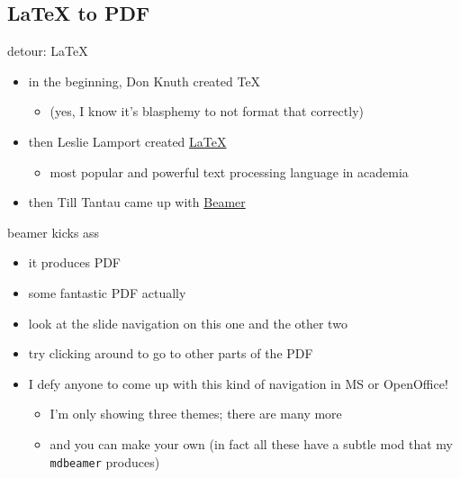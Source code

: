 \documentclass{beamer}
\begin{document}
\subsection{LaTeX to PDF}

\begin{frame}{detour: LaTeX}

\begin{itemize}
\item
in the beginning, Don Knuth created TeX
\begin{itemize}
\item
(yes, I know it's blasphemy to not format that correctly)
\end{itemize}
\item
then Leslie Lamport created \href{http://www.latex-project.org/}{LaTeX}
\begin{itemize}
\item
most popular and powerful text processing language in academia
\end{itemize}
\item
then Till Tantau came up with
\href{http://latex-beamer.sourceforge.net/}{Beamer}
\end{itemize}



\end{frame}

\begin{frame}{beamer kicks ass}

\begin{itemize}
\item
it produces PDF
\pause
\item
some fantastic PDF actually
\pause
\item
look at the slide navigation on this one and the other two
\pause
\item
try clicking around to go to other parts of the PDF
\pause
\item
I defy anyone to come up with this kind of navigation in MS or
OpenOffice!
\begin{itemize}
\item
I'm only showing three themes; there are many more
\item
and you can make your own (in fact all these have a subtle mod that my
\texttt{mdbeamer} produces)
\end{itemize}
\end{itemize}



\end{frame}
\end{document}
